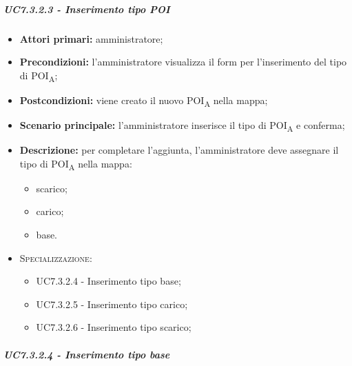 \subparagraph{UC7.3.2.3 - Inserimento tipo POI}

\begin{itemize}

   \item   \textbf{Attori primari:} amministratore;

  \item   \textbf{Precondizioni:} l'amministratore visualizza il form per l'inserimento del tipo di POI\textsubscript{A};

   \item   \textbf{Postcondizioni:} viene creato il nuovo POI\textsubscript{A} nella mappa; 

  \item   \textbf{Scenario principale:} l'amministratore inserisce il tipo di POI\textsubscript{A} e conferma;

   \item   \textbf{Descrizione:} per completare l'aggiunta, l'amministratore deve assegnare il tipo di POI\textsubscript{A} nella mappa:

  \begin{itemize}

       \item scarico;

       \item carico;

       \item base.
   \end{itemize}

   \item   \textsc{Specializzazione:}

   \begin{itemize}

       \item UC7.3.2.4 - Inserimento tipo base;

       \item UC7.3.2.5 - Inserimento tipo carico;

       \item UC7.3.2.6 - Inserimento tipo scarico;

   \end{itemize}



\end{itemize}



\subparagraph{UC7.3.2.4 - Inserimento tipo base}

